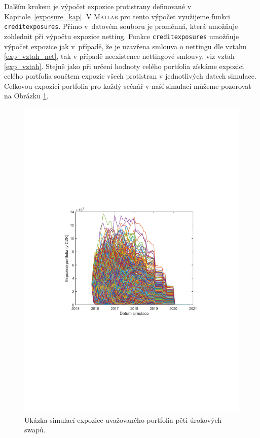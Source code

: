 \documentclass[a4paper,12pt]{report}
\theoremstyle{definition} \newtheorem{definice}[veta]{Definice}
\theoremstyle{remark}
\newcommand{\MATLAB}{\textsc{Matlab}\xspace}
\begin{document}
Dalším krokem je výpočet expozice protistrany definované v Kapitole~\ref{exposure_kap}.
V \MATLAB pro tento výpočet využijeme funkci \verb+creditexposures+.
Přímo v~datovém souboru je proměnná, která umožňuje zohlednit při výpočtu expozice netting.
Funkce \verb+creditexposures+ umožňuje výpočet expozice jak v~případě, že je uzavřena smlouva o nettingu dle vztahu \eqref{exp_vztah_net}, tak v případě neexistence nettingové smlouvy, viz vztah \eqref{exp_vztah}.
Stejně jako při určení hodnoty celého portfolia získáme expozici celého portfolia součtem expozic všech protistran v jednotlivých datech simulace.
Celkovou expozici portfolia pro každý scénář v naší simulaci můžeme pozorovat na Obrázku \ref{PorfolioExposure}.
\begin{figure}[!htbp]
  \centering 
	\includegraphics[width=13cm, clip, trim= 110 270 110 270]{IMG/Expozice_portfolia.pdf}
  \caption{Ukázka simulací expozice uvažovaného portfolia pěti úrokových swapů.}  \label{PorfolioExposure}
\end{figure}
\end{document}
